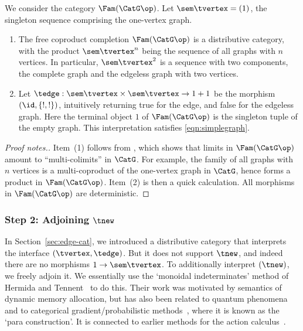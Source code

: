 We consider the category $\Fam(\CatG\op)$. Let $\sem\tvertex=(1)$, the
singleton sequence comprising the one-vertex graph. 
\begin{proposition}\label{prop:FamG}
  \begin{enumerate}
  \item The free coproduct completion $\Fam(\CatG\op)$ is a distributive
    category, with the product $\sem\tvertex^n$ being the sequence of all
    graphs with $n$ vertices.
    In particular, $\sem\tvertex^2$ is a sequence with two components,
    the complete graph and the edgeless graph with two vertices. 
  \item Let $\tedge: \sem\tvertex\times \sem\tvertex\to 1+1$
    be the morphism $(\id,\{!,!\})$, intuitively returning true for
    the edge, and false for the edgeless graph. Here the terminal object $1$
    of $\Fam(\CatG\op)$ is the singleton tuple of the empty graph.
    This interpretation satisfies \eqref{eqn:simplegraph}. 
  \end{enumerate}
\end{proposition}
\begin{proof}[Proof notes.]
  Item~(1) follows from \cite{hu-tholen}, which shows that
  limits in $\Fam(\CatG\op)$ amount to ``multi-colimits'' in $\CatG$. 
  For example, the family of all graphs with $n$ vertices is a
  multi-coproduct of the one-vertex graph in $\CatG$,
  hence forms a product in $\Fam(\CatG\op)$.
  Item~(2) is then a quick calculation. All morphisms in $\Fam(\CatG\op)$ are deterministic. 
\end{proof}

\subsubsection{Step 2: Adjoining $\tnew$}
\newcommand{\CatHT}{\Fam(\CatG\op)[\nu]}

In Section~\ref{sec:edge-cat}, we introduced a distributive category
that interprets the interface $(\tvertex,\tedge)$.
But it does not support $\tnew$, and indeed there are no morphisms
$1\to\sem\tvertex$. 
To additionally
interpret $(\tnew)$, we freely adjoin it. We essentially use the `monoidal
indeterminates' method of Hermida and
Tennent~\cite{hermida-tennent} to do this.
Their work was motivated by semantics of dynamic memory allocation, but has also been
related to quantum phenomena~\cite{hs-quantum,ahk-partial-quantum} and to categorical gradient/probabilistic methods~\cite{para,backprop,Shiebler2021categorical}, where it is known as the `para construction'. It is connected to earlier methods for the action calculus~\cite{pavlovic_1997}.

